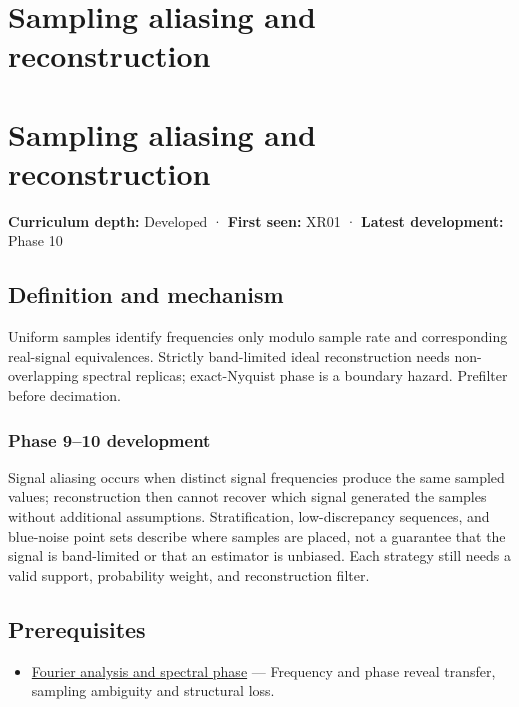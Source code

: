 \hypertarget{appendix-6a7869dd79a6}{}
\section*{Sampling aliasing and reconstruction}
\section{Sampling aliasing and reconstruction}\label{sampling-aliasing-and-reconstruction}

\textbf{Curriculum depth:} Developed · \textbf{First seen:} XR01 · \textbf{Latest development:} Phase 10

\subsection{Definition and mechanism}\label{definition-and-mechanism}

Uniform samples identify frequencies only modulo sample rate and corresponding real-signal equivalences. Strictly band-limited ideal reconstruction needs non-overlapping spectral replicas; exact-Nyquist phase is a boundary hazard. Prefilter before decimation.

\subsubsection{Phase 9--10 development}\label{phase-910-development}

Signal aliasing occurs when distinct signal frequencies produce the same sampled values; reconstruction then cannot recover which signal generated the samples without additional assumptions. Stratification, low-discrepancy sequences, and blue-noise point sets describe where samples are placed, not a guarantee that the signal is band-limited or that an estimator is unbiased. Each strategy still needs a valid support, probability weight, and reconstruction filter.

\subsection{Prerequisites}\label{prerequisites}

\begin{itemize}
\tightlist
\item
  \hyperref[appendix-b60686ba06a1]{Fourier analysis and spectral phase} --- Frequency and phase reveal transfer, sampling ambiguity and structural loss.
\end{itemize}

